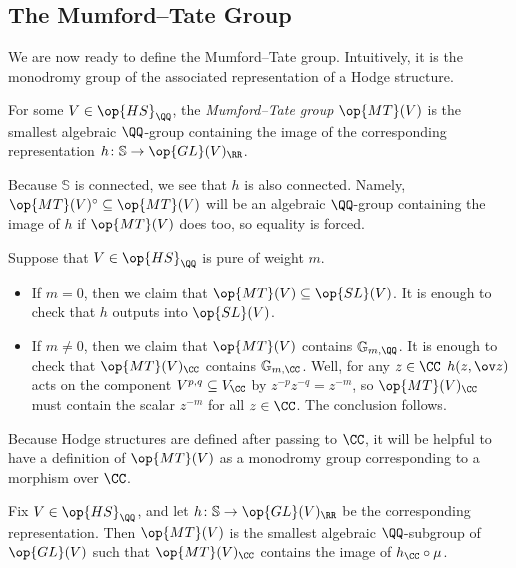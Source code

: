 \documentclass[../thesis.tex]{subfiles}
\begin{document}
\subsection{The Mumford--Tate Group}
We are now ready to define the Mumford--Tate group. Intuitively, it is the monodromy group of the associated representation of a Hodge structure.
\begin{definition}
	For some $V\in\op{HS}_\QQ$, the \textit{Mumford--Tate group} $\op{MT}(V)$ is the smallest algebraic $\QQ$-group containing the image of the corresponding representation $h\colon\mathbb S\to\op{GL}(V)_\RR$.
\end{definition}
\begin{remark} \label{rem:mt-connected}
	Because $\mathbb S$ is connected, we see that $h$ is also connected. Namely, $\op{MT}(V)^\circ\subseteq\op{MT}(V)$ will be an algebraic $\QQ$-group containing the image of $h$ if $\op{MT}(V)$ does too, so equality is forced.
\end{remark}
\begin{example} \label{ex:mt-has-scalars}
	Suppose that $V\in\op{HS}_\QQ$ is pure of weight $m$.
	\begin{itemize}
		\item If $m=0$, then we claim that $\op{MT}(V)\subseteq\op{SL}(V)$. It is enough to check that $h$ outputs into $\op{SL}(V)$. 
		\item If $m\ne0$, then we claim that $\op{MT}(V)$ contains $\mathbb G_{m,\QQ}$. It is enough to check that $\op{MT}(V)_\CC$ contains $\mathbb G_{m,\CC}$. Well, for any $z\in\CC$ $h(z,\ov z)$ acts on the component $V^{p,q}\subseteq V_\CC$ by $z^{-p}z^{-q}=z^{-m}$, so $\op{MT}(V)_\CC$ must contain the scalar $z^{-m}$ for all $z\in\CC$. The conclusion follows.
	\end{itemize}
\end{example}
Because Hodge structures are defined after passing to $\CC$, it will be helpful to have a definition of $\op{MT}(V)$ as a monodromy group corresponding to a morphism over $\CC$.
\begin{lemma} \label{lem:mt-as-monodromy-c}
	Fix $V\in\op{HS}_\QQ$, and let $h\colon\mathbb S\to\op{GL}(V)_\RR$ be the corresponding representation. Then $\op{MT}(V)$ is the smallest algebraic $\QQ$-subgroup of $\op{GL}(V)$ such that $\op{MT}(V)_\CC$ contains the image of $h_\CC\circ\mu$.
\end{lemma}
\end{document}
